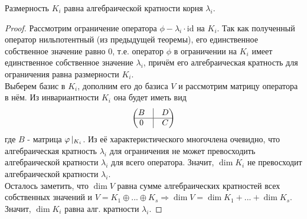     \begin{theorem}
        Размерность $K_i$ равна алгебраической кратности корня $\lambda_i$.
    \end{theorem}
    \begin{proof}
        Рассмотрим ограничение оператора $\phi - \lambda_i\cdot\text{id}$ на $K_i$. Так как полученный оператор нильпотентный (из предыдущей теоремы), его единственное собственное значение равно $0$, т.е. оператор $\phi$ в ограничении на $K_i$ имеет единственное собственное значение $\lambda_i$, причём его алгебраическая кратность для ограничения равна размерности $K_i$.\\
        Выберем базис в $K_i$, дополним его до базиса $V$ и рассмотрим матрицу оператора в нём. Из инвариантности $K_i$ она будет иметь вид 
        $$\begin{pmatrix}
            B & \vline & D \\ \hline 0 & \vline & C
        \end{pmatrix}$$
        где $B$ - матрица $\phi \hspace{0.05cm} |_{K_i}$. Из её характеристического многочлена очевидно, что алгебраическая кратность $\lambda_i$ для ограничения не может превосходить алгебраической кратности $\lambda_i$ для всего оператора. Значит, $\dim K_i$ не превосходит алгебраической кратности $\lambda_i$.\\
        Осталось заметить, что $\dim V$ равна сумме алгебраических кратностей всех собственных значений и $V = K_1 \oplus ... \oplus K_s \Rightarrow \dim V = \dim K_1 + ... + \dim K_s$. Значит, $\dim K_i$ равна алг. кратности $\lambda_i$.      
    \end{proof}